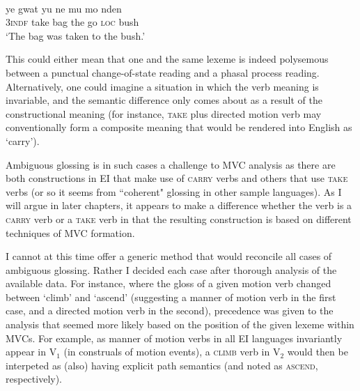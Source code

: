 \ea 
{}\\
\gll ye gwat yu ne mu mo nden \\
3\textsc{indf} take bag the go \textsc{loc} bush \\
\glft `The bag was taken to the bush.' \\ 
\z

This could either mean that one and the same lexeme is indeed polysemous between a punctual change-of-state reading and a phasal process reading. Alternatively, one could imagine a situation in which the verb meaning is invariable, and the semantic difference only comes about as a result of the constructional meaning (for instance, \textsc{take} plus directed motion verb may conventionally form a composite meaning that would be rendered into English as `carry'). 

Ambiguous glossing is in such cases a challenge to MVC analysis as there are both constructions in EI that make use of \textsc{carry} verbs and others that use \textsc{take} verbs (or so it seems from ``coherent" glossing in other sample languages). As I will argue in later chapters, it appears to make a difference whether the verb is a \textsc{carry} verb or a \textsc{take} verb in that the resulting construction is based on different techniques of MVC formation. 

I cannot at this time offer a generic method that would reconcile all cases of ambiguous glossing. Rather I decided each case after thorough analysis of the available data. For instance, where the gloss of a given motion verb changed between `climb' and `ascend' (suggesting a manner of motion verb in the first case, and a directed motion verb in the second), precedence was given to the analysis that seemed more likely based on the position of the given lexeme within MVCs. For example, as manner of motion verbs in all EI languages invariantly appear in V$_1$ (in construals of motion events), a \textsc{climb} verb in V$_2$ would then be interpeted as (also) having explicit path semantics (and noted as \textsc{ascend}, respectively). 

